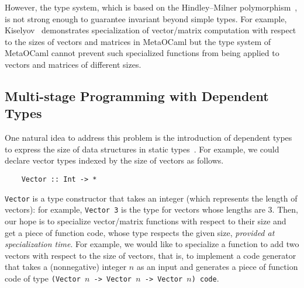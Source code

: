 
However, the type system, which is based on the Hindley--Milner
polymorphism~\cite{Milner78JCSS}, is not strong enough to guarantee
invariant beyond simple types.  For example, Kiselyov~\cite{8384206}
demonstrates specialization of vector/matrix computation with respect
to the sizes of vectors and matrices in MetaOCaml but the type system
of MetaOCaml cannot prevent such specialized functions from being applied to
vectors and matrices of different sizes.




\subsection{Multi-stage Programming with Dependent Types}


One natural idea to address this problem is the introduction of dependent types
to express the size of data structures in static types~\cite{Xi98}.
For example, we could declare vector types indexed by the size of
vectors as follows.
\begin{verbatim}
    Vector :: Int -> *
\end{verbatim}
\verb|Vector| is a type constructor that takes an integer (which
represents the length of vectors): for example, \verb|Vector 3| is the
type for vectors whose lengths are 3.  Then, our hope is to specialize
vector/matrix functions with respect to their size and get a piece of
function code, whose type respects the given size, \emph{provided at
  specialization time}.  For example, we would like to specialize a
function to add two vectors with respect to the size of vectors, that
is, to implement a code generator that takes a (nonnegative) integer $n$ as an
input and generates a piece of function code of type
\verb|(Vector |$n$\verb| -> Vector |$n$\verb| -> Vector |$n$\verb|) code|.

